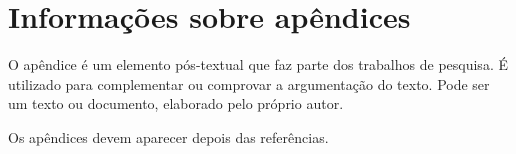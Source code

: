 \chapter{Informações sobre apêndices}
\label{append:info}

O apêndice é um elemento pós-textual que faz parte dos trabalhos de pesquisa. É utilizado para complementar ou comprovar a argumentação do texto. Pode ser um texto ou documento, elaborado pelo próprio autor.

Os apêndices devem aparecer depois das referências.